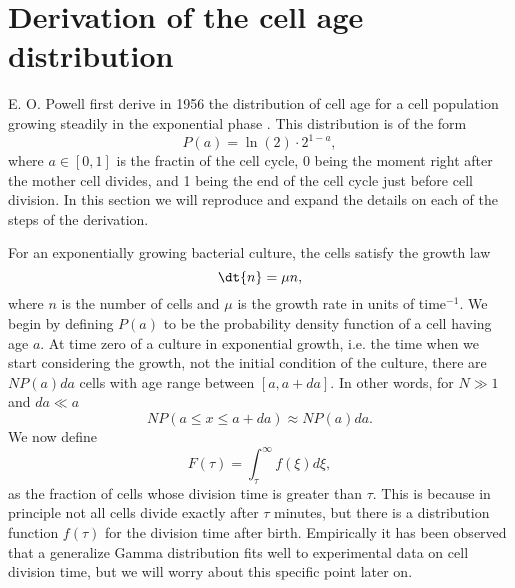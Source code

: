 \section{Derivation of the cell age distribution}
\label{supp_cell_age_dist}

E. O. Powell first derive in 1956 the distribution of cell age for a cell
population growing steadily in the exponential phase \cite{Powell1956}. This
distribution is of the form
\begin{equation}
  P(a) = \ln(2) \cdot 2^{1 - a},
\end{equation}
where $a \in [0, 1]$ is the fractin of the cell cycle, 0 being the moment right
after the mother cell divides, and 1 being the end of the cell cycle just before
cell division. In this section we will reproduce and expand the details on each
of the steps of the derivation.

For an exponentially growing bacterial culture, the cells satisfy the growth law
\begin{equation}
  {\dt{n}} = \mu n,
  \label{seq_growth_ode}
\end{equation}
where $n$ is the number of cells and $\mu$ is the growth rate in units of
time$^{-1}$. We begin by defining $P(a)$ to be the probability density function
of a cell having age $a$. At time zero of a culture in exponential growth, i.e.
the time when we start considering the growth, not the initial condition of the
culture, there are $NP(a)da$ cells with age range between $[a, a + da]$. In
other words, for $N \gg 1$ and $da \ll a$
\begin{equation}
  N P(a \leq x \leq a + da) \approx N P(a)da.
\end{equation}
We now define
\begin{equation}
  F(\tau) = \int_\tau^\infty f(\xi) d\xi,
\end{equation}
as the fraction of cells whose division time is greater than $\tau$. This is
because in principle not all cells divide exactly after $\tau$ minutes, but
there is a distribution function $f(\tau)$ for the division time after birth.
Empirically it has been observed that a generalize Gamma distribution fits well
to experimental data on cell division time, but we will worry about this
specific point later on.

